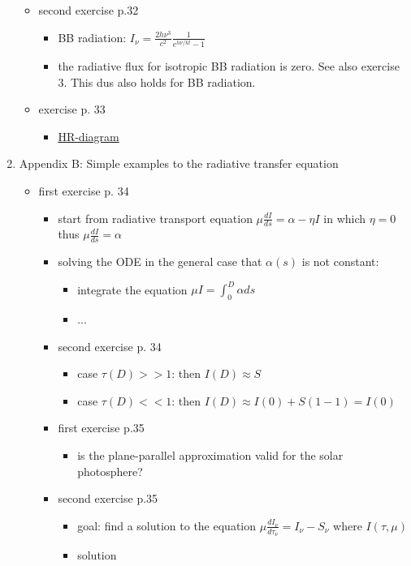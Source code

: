 \documentclass[../main/main.tex]{subfiles}
\begin{document}
\begin{enumerate}
\begin{itemize}
\item second exercise p.32
\begin{itemize}
\item BB radiation: $I_{\nu} = \frac{2h \nu^3}{c^2} \frac{1}{e^{h \nu/kt}-1}$
\item the radiative flux for isotropic BB radiation is zero. See also exercise 3. This dus also holds for BB radiation.
\end{itemize}

\item exercise p. 33
\begin{itemize}
\item \underline{HR-diagram}
\end{itemize}

\end{itemize}

\item Appendix B: Simple examples to the radiative transfer equation
\begin{itemize}

\item first exercise p. 34
\begin{itemize}
\item start from radiative transport equation $\mu \frac{dI}{ds} = \alpha - \eta I$ in which $\eta = 0$ thus $\boxed{\mu \frac{dI}{ds} = \alpha}$
\item solving the ODE in the general case that $\alpha(s)$ is not constant: 
\begin{itemize}
\item integrate the equation $\mu I = \int_0^D \alpha ds$
\item ...
\end{itemize}
 
\item second exercise p. 34
\begin{itemize}
\item case $\tau(D) >> 1$: then $I(D) \approx S$ 
\item case $\tau(D) << 1$: then $I(D) \approx I(0)+S(1-1) = I(0)$
\end{itemize} 
 
\item first exercise p.35
\begin{itemize}
\item is the plane-parallel approximation valid for the solar photosphere?
\end{itemize} 

\item second exercise p.35
\begin{itemize}
\item goal: find a solution to the equation $\mu \frac{dI_{\nu}}{d\tau_{\nu}} = I_{\nu} - S_{\nu}$ where $I(\tau,\mu)$
\item solution
\end{itemize}
 

\end{itemize}
\end{itemize}
\end{enumerate}
\end{document}

